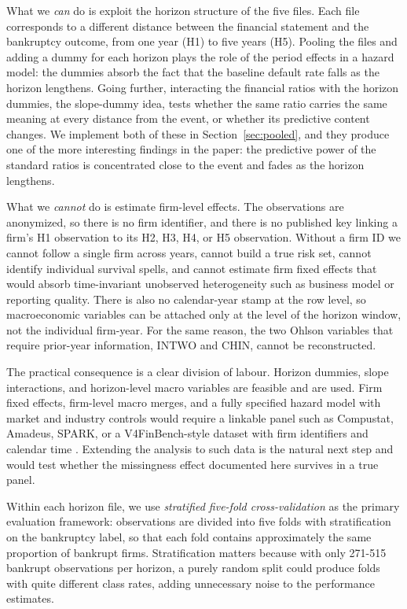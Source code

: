 \documentclass[12pt,a4paper]{article}
\begin{document}
What we \emph{can} do is exploit the horizon structure of the five files. Each
file corresponds to a different distance between the financial statement and
the bankruptcy outcome, from one year (H1) to five years (H5). Pooling the
files and adding a dummy for each horizon plays the role of the period effects
in a hazard model: the dummies absorb the fact that the baseline default rate
falls as the horizon lengthens. Going further, interacting the financial ratios
with the horizon dummies, the slope-dummy idea, tests whether the same ratio
carries the same meaning at every distance from the event, or whether its
predictive content changes. We implement both of these in
Section~\ref{sec:pooled}, and they produce one of the more interesting findings
in the paper: the predictive power of the standard ratios is concentrated close
to the event and fades as the horizon lengthens.

What we \emph{cannot} do is estimate firm-level effects. The observations are
anonymized, so there is no firm identifier, and there is no published key
linking a firm's H1 observation to its H2, H3, H4, or H5 observation. Without a
firm ID we cannot follow a single firm across years, cannot build a true risk
set, cannot identify individual survival spells, and cannot estimate firm fixed
effects that would absorb time-invariant unobserved heterogeneity such as
business model or reporting quality. There is also no calendar-year stamp at
the row level, so macroeconomic variables can be attached only at the level of
the horizon window, not the individual firm-year. For the same reason, the two
Ohlson variables that require prior-year information, INTWO and CHIN, cannot be
reconstructed.

The practical consequence is a clear division of labour. Horizon dummies, slope
interactions, and horizon-level macro variables are feasible and are used.
Firm fixed effects, firm-level macro merges, and a fully specified hazard model
with market and industry controls would require a linkable panel such as
Compustat, Amadeus, SPARK, or a V4FinBench-style dataset with firm identifiers
and calendar time \citep{kostrzewa2025}. Extending the analysis to such data is
the natural next step and would test whether the missingness effect documented
here survives in a true panel.

Within each horizon file, we use \textit{stratified five-fold
cross-validation} as the primary evaluation framework: observations are
divided into five folds with stratification on the bankruptcy label, so that
each fold contains approximately the same proportion of bankrupt firms.
Stratification matters because with only 271-515 bankrupt observations per
horizon, a purely random split could produce folds with quite different class
rates, adding unnecessary noise to the performance estimates.
\end{document}
